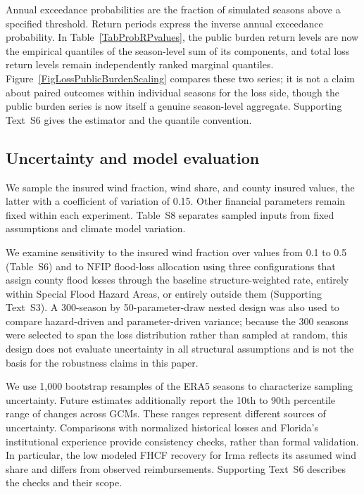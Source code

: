 Annual exceedance probabilities are the fraction of simulated seasons above a specified threshold. Return periods express the inverse annual exceedance probability. In Table~\ref{TabProbRPvalues}, the public burden return levels are now the empirical quantiles of the season-level sum of its components, and total loss return levels remain independently ranked marginal quantiles. Figure~\ref{FigLossPublicBurdenScaling} compares these two series; it is not a claim about paired outcomes within individual seasons for the loss side, though the public burden series is now itself a genuine season-level aggregate. Supporting Text~S6 gives the estimator and the quantile convention.

\subsection{Uncertainty and model evaluation}\label{MethodsUncertainty}
We sample the insured wind fraction, wind share, and county insured values, the latter with a coefficient of variation of 0.15. Other financial parameters remain fixed within each experiment. Table~S8 separates sampled inputs from fixed assumptions and climate model variation.

We examine sensitivity to the insured wind fraction over values from 0.1 to 0.5 (Table~S6) and to NFIP flood-loss allocation using three configurations that assign county flood losses through the baseline structure-weighted rate, entirely within Special Flood Hazard Areas, or entirely outside them (Supporting Text~S3). A 300-season by 50-parameter-draw nested design was also used to compare hazard-driven and parameter-driven variance; because the 300 seasons were selected to span the loss distribution rather than sampled at random, this design does not evaluate uncertainty in all structural assumptions and is not the basis for the robustness claims in this paper.

We use 1,000 bootstrap resamples of the ERA5 seasons to characterize sampling uncertainty. Future estimates additionally report the 10th to 90th percentile range of changes across GCMs. These ranges represent different sources of uncertainty. Comparisons with normalized historical losses and Florida's institutional experience provide consistency checks, rather than formal validation. In particular, the low modeled FHCF recovery for Irma reflects its assumed wind share and differs from observed reimbursements. Supporting Text~S6 describes the checks and their scope.
